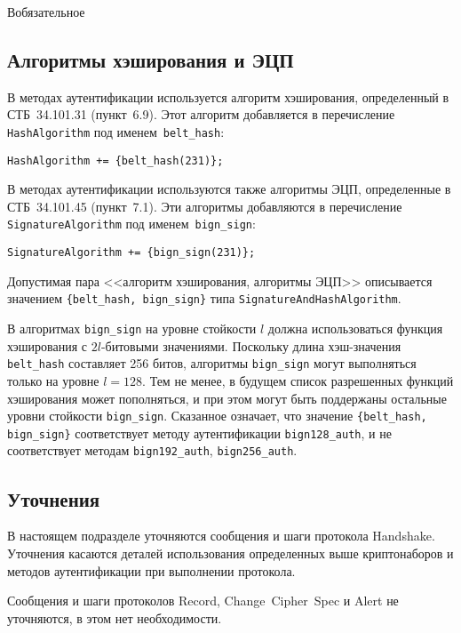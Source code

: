\begin{appendix}{В}{обязательное}
\subsection{Алгоритмы хэширования и ЭЦП}\label{BSUITES.3.3}

В методах аутентификации используется алгоритм хэширования, определенный в 
СТБ~34.101.31 (пункт~6.9). Этот алгоритм добавляется в перечисление 
\lstinline{HashAlgorithm} под именем~\lstinline{belt_hash}:
\begin{lstlisting}
HashAlgorithm += {belt_hash(231)};
\end{lstlisting}
 
В методах аутентификации используются также алгоритмы ЭЦП, определенные в 
СТБ~34.101.45 (пункт~7.1). Эти алгоритмы добавляются в перечисление 
\lstinline{SignatureAlgorithm} под именем~\lstinline{bign_sign}: 
\begin{lstlisting}
SignatureAlgorithm += {bign_sign(231)};
\end{lstlisting}

Допустимая пара <<алгоритм хэширования, алгоритмы ЭЦП>> описывается значением 
\lstinline|{belt_hash, bign_sign}| типа \lstinline{SignatureAndHashAlgorithm}. 

В алгоритмах \lstinline{bign_sign} на уровне стойкости $l$ должна
использоваться функция хэширования с $2l$-битовыми значениями. Поскольку
длина хэш-значения \lstinline{belt_hash} составляет 256 битов, алгоритмы
\lstinline{bign_sign} могут выполняться только на уровне $l = 128$. Тем не
менее, в будущем список разрешенных функций хэширования может пополняться,
и при этом могут быть поддержаны остальные уровни стойкости
\lstinline{bign_sign}. Сказанное означает, что значение
\lstinline|{belt_hash, bign_sign}| соответствует методу аутентификации
\lstinline{bign128_auth}, и не соответствует методам
\lstinline{bign192_auth}, \lstinline{bign256_auth}.

\label{BSUITES.4}

\subsection{Уточнения}\label{BSUITES.4.1}

В настоящем подразделе уточняются сообщения и шаги протокола
Handshake. Уточнения касаются деталей использования
определенных выше криптонаборов и методов аутентификации при выполнении
протокола.

Сообщения и шаги протоколов Record, 
Change~Cipher~Spec и Alert не уточняются, в этом 
нет необходимости. 


\end{appendix}
